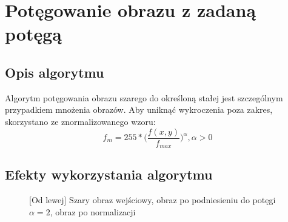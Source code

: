 \documentclass[a4paper,12pt, titlepage]{report}
\begin{document}
\section{Potęgowanie obrazu z zadaną potęgą}
\subsection*{Opis algorytmu}
\par Algorytm potęgowania obrazu szarego do określoną stałej jest szczególnym przypadkiem mnożenia obrazów. Aby uniknąć wykroczenia poza zakres, skorzystano ze znormalizowanego wzoru: \[f_{m}=255*\Big(\frac{f(x,y)}{f_{max}}\Big)^{\alpha},  \alpha>0\]
\subsection*{Efekty wykorzystania algorytmu}
\begin{figure}[h]
    \centering
    \caption{[Od lewej] Szary obraz wejściowy, obraz po podniesieniu do potęgi \(\alpha=2\), obraz po normalizacji}%
    \label{fig:geo_after_grey1}%
\end{figure}
\end{document}
